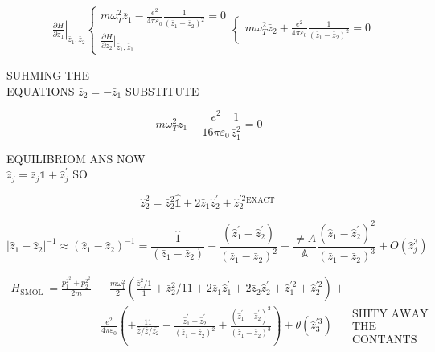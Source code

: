 $$
\begin{aligned}
& \left.\frac{\partial H}{\partial z_{1}}\right|_{\bar{z}_{1}, \bar{z}_{2}}\left\{\begin{array} { l } 
{ m \omega _ { T } ^ { 2 } \overline { z } _ { 1 } - \frac { e ^ { 2 } } { 4 \pi \varepsilon _ { 0 } } \frac { 1 } { ( \overline { z } _ { 1 } - \overline { z } _ { 2 } ) ^ { 2 } } = 0 } \\
{ \frac { \partial H } { \partial z _ { 2 } } | _ { \overline { z } _ { 1 } , \overline { z } _ { 1 } } }
\end{array} \left\{\begin{array}{l}
m \omega_{T}^{2} \bar{z}_{2}+\frac{e^{2}}{4 \pi \varepsilon_{0}} \frac{1}{\left(\bar{z}_{1}-\bar{z}_{2}\right)^{2}}=0
\end{array}\right.\right.
\end{aligned}
$$

SUHMING THE\\
EQUATIONS $\bar{z}_{2}=-\bar{z}_{1}$ SUBSTITUTE

$$
m \omega_{T}^{2} \bar{z}_{1}-\frac{e^{2}}{16 \pi \varepsilon_{0}} \frac{1}{\bar{z}_{1}^{2}}=0
$$

EQUILIBRIOM ANS NOW\\
$\hat{z}_{j}=\bar{z}_{j} \mathbb{1}+\hat{z}_{j}^{\prime}$ SO

$$
\hat{z}_{2}^{2}=\bar{z}_{2}^{2} \hat{\mathbb{1}}+2 \bar{z}_{1} \hat{z}_{2}^{\prime}+\hat{z}_{2}^{\prime 2}{ }^{\text {EXACT }}
$$

$$
\left|\hat{z}_{1}-\hat{z}_{2}\right|^{-1} \approx\left(\hat{z}_{1}-\hat{z}_{2}\right)^{-1}=\frac{\hat{1}}{\left(\bar{z}_{1}-\bar{z}_{2}\right)}-\frac{\left(\hat{z}_{1}^{\prime}-\hat{z}_{2}^{\prime}\right)}{\left(\bar{z}_{1}-\bar{z}_{2}\right)^{2}}+\frac{\neq A}{\mathbb{A}} \frac{\left(\hat{z}_{1}-\hat{z}_{2}^{\prime}\right)^{2}}{\left(\bar{z}_{1}-\bar{z}_{2}\right)^{3}}+O\left(\hat{z}_{j}^{3}\right)
$$

$$
\begin{aligned}
H_{\text {SMOL }}=\frac{p_{1}^{2^{2}}+p_{2}^{2^{2}}}{2 m} & +\frac{m \omega_{1}^{2}}{2}\left(\frac{\bar{z}_{1}^{2} / 1}{1}+\bar{z}_{2}^{2} / 11+2 \bar{z}_{1} \hat{z}_{1}^{\prime}+2 \bar{z}_{2} \hat{z}_{2}^{\prime}+\hat{z}_{1}^{\prime 2}+\hat{z}_{2}^{\prime 2}\right)+ \\
& \frac{e^{2}}{4 \pi \varepsilon_{0}}\left(+\frac{11}{\bar{z} / \bar{z} / \overline{z_{2}}}-\frac{\hat{z}_{1}^{\prime}-\hat{z}_{2}^{\prime}}{\left(\bar{z}_{1}-\bar{z}_{2}\right)^{2}}+\frac{\left(\hat{z}_{1}^{\prime}-\hat{z}_{2}^{\prime}\right)^{2}}{\left(\bar{z}_{1}-\bar{z}_{2}\right)^{3}}\right)+\theta\left(\hat{z}_{3}^{\prime 3}\right) \quad \begin{array}{c}
\text { SHITY AWAY } \\
\text { THE } \\
\text { CONTANTS }
\end{array}
\end{aligned}
$$

